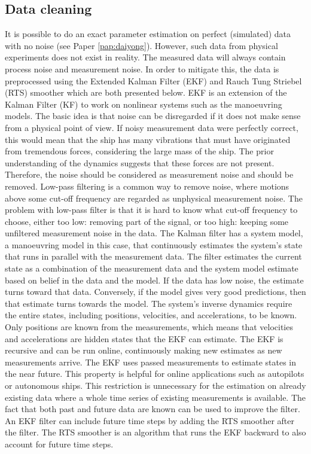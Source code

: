 \subsection{Data cleaning}
\label{sec:datacleaning}
It is possible to do an exact parameter estimation on perfect (simulated) data with no noise (see Paper \ref{pap:daiyong}). However, such data from physical experiments does not exist in reality. The measured data will always contain process noise and measurement noise. In order to mitigate this, the data is preprocessed using the Extended Kalman Filter (EKF) \cite{brown_introduction_1997} and Rauch Tung Striebel (RTS) smoother \cite{rauch_maximum_1965} which are both presented below.
EKF is an extension of the Kalman Filter (KF) to work on nonlinear systems such as the manoeuvring models. The basic idea is that noise can be disregarded if it does not make sense from a physical point of view. If noisy measurement data were perfectly correct, this would mean that the ship has many vibrations that must have originated from tremendous forces, considering the large mass of the ship. The prior understanding of the dynamics suggests that these forces are not present. Therefore, the noise should be considered as measurement noise and should be removed. Low-pass filtering is a common way to remove noise, where motions above some cut-off frequency are regarded as unphysical measurement noise. The problem with low-pass filter is that it is hard to know what cut-off frequency to choose, either too low: removing part of the signal, or too high: keeping some unfiltered measurement noise in the data. The Kalman filter has a system model, a manoeuvring model in this case, that continuously estimates the system’s state that runs in parallel with the measurement data. The filter estimates the current state as a combination of the measurement data and the system model estimate based on belief in the data and the model. If the data has low noise, the estimate turns toward that data. Conversely, if the model gives very good predictions, then that estimate turns towards the model.
The system’s inverse dynamics require the entire states, including positions, velocities, and accelerations, to be known. Only positions are known from the measurements, which means that velocities and accelerations are hidden states that the EKF can estimate.
The EKF is recursive and can be run online, continuously making new estimates as new measurements arrive. The EKF uses passed measurements to estimate states in the near future. This property is helpful for online applications such as  autopilots or autonomous ships. This restriction is  unnecessary for the estimation on already existing data where a whole time series of existing measurements is available. The fact that both past and future data are known can be used to improve the filter. An EKF filter can include future time steps by adding the RTS smoother after the filter. The RTS smoother is an algorithm that runs the EKF backward to also account for future time steps.

